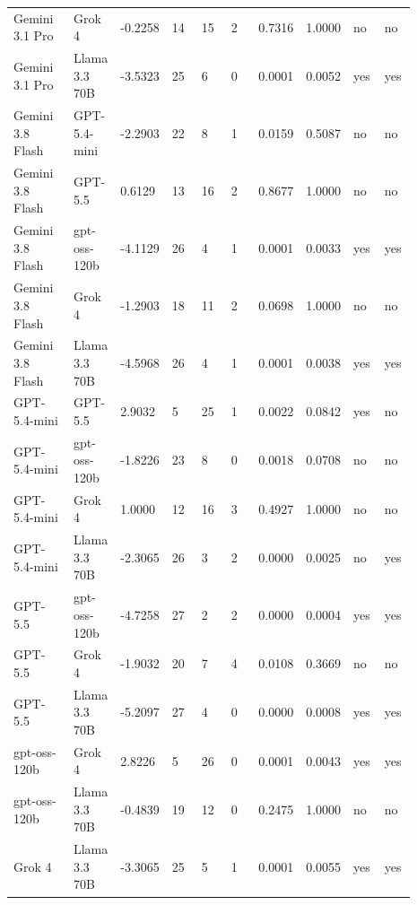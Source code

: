 \begin{landscape}
\begin{longtable}{p{0.162\linewidth}p{0.081\linewidth}p{0.081\linewidth}p{0.081\linewidth}p{0.081\linewidth}p{0.081\linewidth}p{0.081\linewidth}p{0.081\linewidth}p{0.081\linewidth}p{0.081\linewidth}}
Gemini 3.1 Pro & Grok 4 & -0.2258 & 14 & 15 & 2 & 0.7316 & 1.0000 & no & no \\
Gemini 3.1 Pro & Llama 3.3 70B & -3.5323 & 25 & 6 & 0 & 0.0001 & 0.0052 & yes & yes \\
Gemini 3.8 Flash & GPT-5.4-mini & -2.2903 & 22 & 8 & 1 & 0.0159 & 0.5087 & no & no \\
Gemini 3.8 Flash & GPT-5.5 & 0.6129 & 13 & 16 & 2 & 0.8677 & 1.0000 & no & no \\
Gemini 3.8 Flash & gpt-oss-120b & -4.1129 & 26 & 4 & 1 & 0.0001 & 0.0033 & yes & yes \\
Gemini 3.8 Flash & Grok 4 & -1.2903 & 18 & 11 & 2 & 0.0698 & 1.0000 & no & no \\
Gemini 3.8 Flash & Llama 3.3 70B & -4.5968 & 26 & 4 & 1 & 0.0001 & 0.0038 & yes & yes \\
GPT-5.4-mini & GPT-5.5 & 2.9032 & 5 & 25 & 1 & 0.0022 & 0.0842 & yes & no \\
GPT-5.4-mini & gpt-oss-120b & -1.8226 & 23 & 8 & 0 & 0.0018 & 0.0708 & no & no \\
GPT-5.4-mini & Grok 4 & 1.0000 & 12 & 16 & 3 & 0.4927 & 1.0000 & no & no \\
GPT-5.4-mini & Llama 3.3 70B & -2.3065 & 26 & 3 & 2 & 0.0000 & 0.0025 & no & yes \\
GPT-5.5 & gpt-oss-120b & -4.7258 & 27 & 2 & 2 & 0.0000 & 0.0004 & yes & yes \\
GPT-5.5 & Grok 4 & -1.9032 & 20 & 7 & 4 & 0.0108 & 0.3669 & no & no \\
GPT-5.5 & Llama 3.3 70B & -5.2097 & 27 & 4 & 0 & 0.0000 & 0.0008 & yes & yes \\
gpt-oss-120b & Grok 4 & 2.8226 & 5 & 26 & 0 & 0.0001 & 0.0043 & yes & yes \\
gpt-oss-120b & Llama 3.3 70B & -0.4839 & 19 & 12 & 0 & 0.2475 & 1.0000 & no & no \\
Grok 4 & Llama 3.3 70B & -3.3065 & 25 & 5 & 1 & 0.0001 & 0.0055 & yes & yes \\
\bottomrule
\end{longtable}
\normalsize
\end{landscape}
